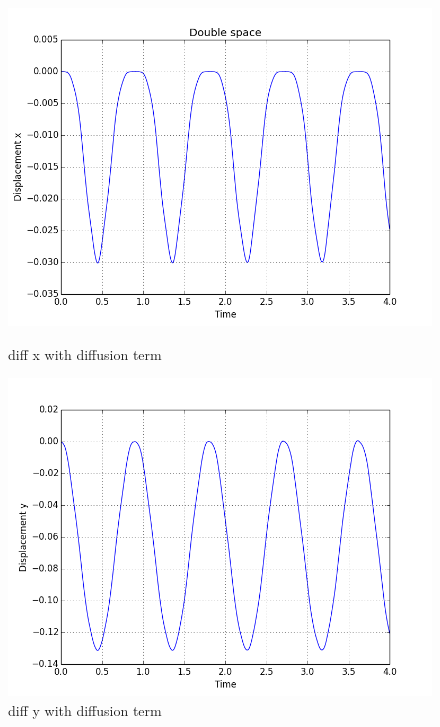 \begin{figure}[ht] 
  \label{ fig7} 
  \begin{minipage}[b]{0.6\linewidth}
    \centering
    \includegraphics[width=1\linewidth]{med_diff_x.png} 
    \caption{diff x with diffusion term} 
    \vspace{4ex}
  \end{minipage}%
  \begin{minipage}[b]{0.6\linewidth}
    \centering
    \includegraphics[width=1\linewidth]{med_diff_y.png} 
    \caption{diff y with diffusion term} 
    \vspace{4ex}
  \end{minipage} 
  \begin{minipage}[b]{0.6\linewidth}

\end{minipage}
\end{figure}
